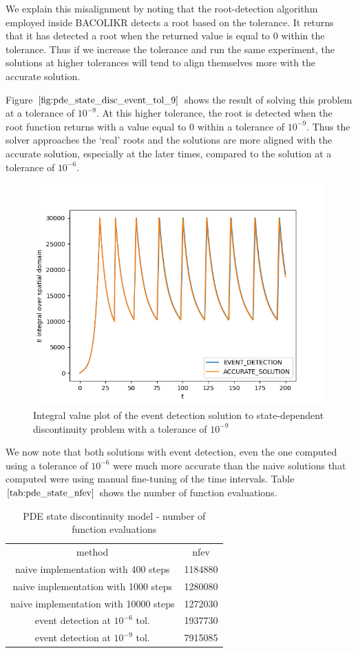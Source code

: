 \documentclass{article}
\begin{document}
We explain this misalignment by noting that the root-detection algorithm employed inside BACOLIKR detects a root based on the tolerance. It returns that it has detected a root when the returned value is equal to 0 within the tolerance. Thus if we increase the tolerance and run the same experiment, the solutions at higher tolerances will tend to align themselves more with the accurate solution.

Figure $\ref{fig:pde_state_disc_event_tol_9}$ shows the result of solving this problem at a tolerance of $10^{-9}$. At this higher tolerance, the root is detected when the root function returns with a value equal to 0 within a tolerance of $10^{-9}$. Thus the solver approaches the `real' roots and the solutions are more aligned with the accurate solution, especially at the later times, compared to the solution at a tolerance of $10^{-6}$.


\begin{figure}[H]
\centering
\includegraphics[width=0.7\linewidth]{./figures/pde_state_disc_event_tol_9}
\caption{Integral value plot of the event detection solution to state-dependent discontinuity problem with a tolerance of $10^{-9}$}
\label{fig:pde_state_disc_event_tol_9}
\end{figure}

We now note that both solutions with event detection, even the one computed using a tolerance of $10^{-6}$ were much more accurate than the naive solutions that computed were using manual fine-tuning of the time intervals. Table $\ref{tab:pde_state_nfev}$ shows the number of function evaluations. 

\begin{table}[h]
\caption {PDE state discontinuity model - number of function evaluations} 
\label{tab:pde_state_nfev}
\begin{center}
\begin{tabular}{ c c } 
method & nfev \\ 
naive implementation with 400 steps   & 1184880 \\
naive implementation with 1000 steps  & 1280080 \\
naive implementation with 10000 steps & 1272030 \\
event detection at $10^{-6}$ tol.     & 1937730 \\
event detection at $10^{-9}$ tol.     & 7915085 \\
\end{tabular}
\end{center}
\end{table}
\end{document}
